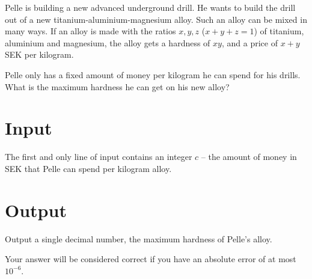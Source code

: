 Pelle is building a new advanced underground drill.
He wants to build the drill out of a new titanium-aluminium-magnesium alloy.
Such an alloy can be mixed in many ways.
If an alloy is made with the ratios $x, y, z$ ($x + y + z = 1$) of titanium, aluminium and magnesium, the alloy gets a hardness of $xy$, and a price of $x + y$ SEK per kilogram.

Pelle only has a fixed amount of money per kilogram he can spend for his drills.
What is the maximum hardness he can get on his new alloy?

\section*{Input}
The first and only line of input contains an integer $c$ -- the amount of money in SEK that Pelle can spend per kilogram alloy.

\section*{Output}
Output a single decimal number, the maximum hardness of Pelle's alloy.

Your answer will be considered correct if you have an absolute error of at most ${10}^{-6}$.
